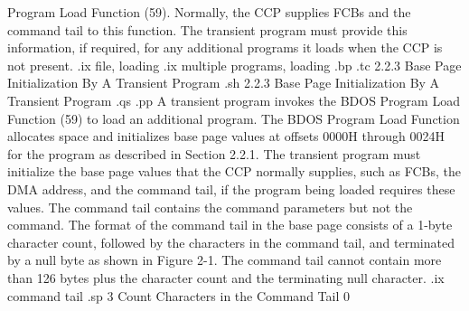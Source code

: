 Program Load Function (59).  Normally, the CCP supplies FCBs and
the command tail to this function.  The transient program must
provide this information, if required, for any additional
programs it loads when the CCP is not present. 
.ix file, loading
.ix multiple programs, loading
.bp
.tc         2.2.3  Base Page Initialization By A Transient Program
.sh
2.2.3  Base Page Initialization By A Transient Program
.qs
.pp 
A transient program invokes the BDOS Program Load Function (59)  to
load an additional program.  The BDOS Program Load Function allocates space
and initializes base page values at offsets 0000H through 0024H for the 
program as described in
Section 2.2.1.  The transient program must initialize the base
page values that the CCP normally supplies, such as FCBs, the DMA
address, and the command tail, if the program being loaded requires these
values.  The command tail contains the command parameters but not
the command.  The format of the command tail in the base page
consists of a 1-byte character count, followed by the characters
in the command tail, and terminated by a null byte as shown in
Figure 2-1.  The command tail cannot contain more than 126 bytes
plus the character count and the terminating null character.
.ix command tail
.sp 3
        Count        Characters in the Command Tail        0     

